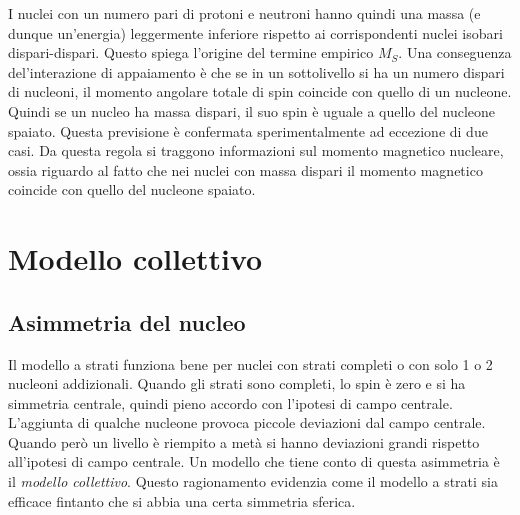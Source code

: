 I nuclei con un numero pari di protoni e neutroni hanno quindi una massa (e
dunque un'energia) leggermente inferiore rispetto ai corrispondenti nuclei
isobari dispari-dispari. Questo spiega l'origine del termine empirico $M_S$.
Una conseguenza del'interazione di appaiamento è che se in un sottolivello si ha
un numero dispari di nucleoni, il momento angolare totale di spin coincide con
quello di un nucleone. Quindi se un nucleo ha massa dispari, il suo spin è
uguale a quello del nucleone spaiato. Questa previsione è confermata
sperimentalmente ad eccezione di due casi. Da questa regola si traggono
informazioni sul momento magnetico nucleare, ossia riguardo al fatto che nei
nuclei con massa dispari il momento magnetico coincide con quello del nucleone
spaiato.

\section{Modello collettivo}
\subsection{Asimmetria del nucleo}
Il modello a strati funziona bene per nuclei con strati completi o con solo 1 o 2 nucleoni addizionali. Quando gli strati sono completi, lo spin è zero e si ha simmetria centrale, quindi pieno accordo con l'ipotesi di campo centrale. L'aggiunta di qualche nucleone provoca piccole deviazioni dal campo centrale. Quando però un livello è riempito a metà si hanno deviazioni grandi rispetto all'ipotesi di campo centrale. Un modello che tiene conto di questa asimmetria è il \textit{modello collettivo}.
Questo ragionamento evidenzia come il modello a strati sia efficace fintanto che si abbia una certa simmetria sferica.
